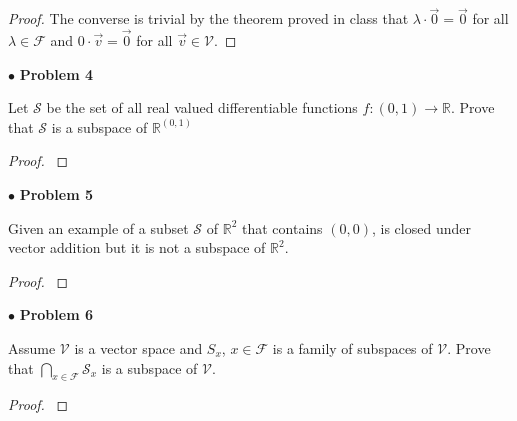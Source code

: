 \documentclass{article}
\begin{document}
\begin{proof}
The converse is trivial by the theorem proved in class that $\lambda \cdot \vec{0} = \vec{0}$ for all $\lambda \in \mathcal{F}$ and $0 \cdot \vec{v} = \vec{0}$ for all $\vec{v} \in \mathcal{V}$. 

\end{proof}


\newpage
$\bullet$ \textbf{Problem 4}
\medskip

\begin{itshape}
Let $\mathcal{S}$ be the set of all real valued differentiable functions $f:(0,1) \to \mathbb{R}$. Prove that $\mathcal{S}$ is a subspace of $\mathbb{R}^{(0,1)}$
\end{itshape}
\medskip

\begin{proof}
$ $ \newline
\end{proof}


\newpage
$\bullet$ \textbf{Problem 5}
\medskip

\begin{itshape}
Given an example of a subset $\mathcal{S}$ of $\mathbb{R}^2$ that contains $(0,0)$, is closed under vector addition but it is not a subspace of $\mathbb{R}^2$.
\end{itshape}
\medskip

\begin{proof}
$ $ \newline
\end{proof}


\newpage
$\bullet$ \textbf{Problem 6}
\medskip

\begin{itshape}
Assume $\mathcal{V}$ is a vector space and $S_{x}$, $x \in \mathcal{F}$ is a family of subspaces of $\mathcal{V}$. Prove that $\bigcap \limits_{x \in \mathcal{F}} \mathcal{S}_{x}$ is a subspace of $\mathcal{V}$.
\end{itshape}
\medskip

\begin{proof}
$ $ \newline
\end{proof}
\end{document}
